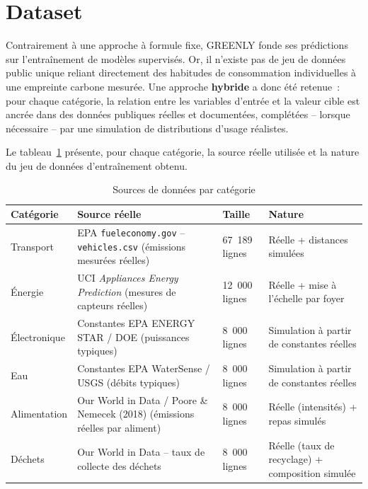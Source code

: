 \section{Dataset}

Contrairement à une approche à formule fixe, GREENLY fonde ses prédictions sur l'entraînement de modèles supervisés. Or, il n'existe pas de jeu de données public unique reliant directement des habitudes de consommation individuelles à une empreinte carbone mesurée. Une approche \textbf{hybride} a donc été retenue~: pour chaque catégorie, la relation entre les variables d'entrée et la valeur cible est ancrée dans des données publiques réelles et documentées, complétées -- lorsque nécessaire -- par une simulation de distributions d'usage réalistes.

Le tableau~\ref{tab:datasets} présente, pour chaque catégorie, la source réelle utilisée et la nature du jeu de données d'entraînement obtenu.

\begin{table}[H]
\centering
\caption{Sources de données par catégorie}
\label{tab:datasets}
\begin{tabular}{|p{2.1cm}|p{4.6cm}|p{2cm}|p{4.4cm}|}
\hline
\rowcolor{isiBlue!15}
\textbf{Catégorie} & \textbf{Source réelle} & \textbf{Taille} & \textbf{Nature} \\
\hline
Transport & EPA \texttt{fueleconomy.gov} -- \texttt{vehicles.csv} (émissions mesurées réelles) \cite{epaVehicles} & 67~189 lignes & Réelle + distances simulées \\ \hline
Énergie & UCI \textit{Appliances Energy Prediction} \cite{candanedo2017} (mesures de capteurs réelles) & 12~000 lignes & Réelle + mise à l'échelle par foyer \\ \hline
Électronique & Constantes EPA ENERGY STAR / DOE (puissances typiques) \cite{energyStar} & 8~000 lignes & Simulation à partir de constantes réelles \\ \hline
Eau & Constantes EPA WaterSense / USGS (débits typiques) \cite{waterSense} & 8~000 lignes & Simulation à partir de constantes réelles \\ \hline
Alimentation & Our World in Data / Poore \& Nemecek (2018) \cite{poore2018} (émissions réelles par aliment) & 8~000 lignes & Réelle (intensités) + repas simulés \\ \hline
Déchets & Our World in Data -- taux de collecte des déchets \cite{owidWaste} & 8~000 lignes & Réelle (taux de recyclage) + composition simulée \\ \hline
\end{tabular}
\end{table}

